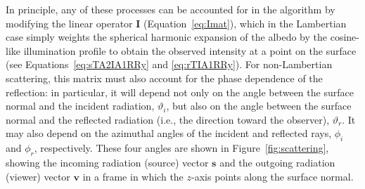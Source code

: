 \documentclass[modern]{aastex62}
\begin{document}
In principle, any of these processes can be accounted for in
the \starry algorithm by modifying the linear operator
$\mathbf{I}$ (Equation~\ref{eq:Imat}), which in the Lambertian
case simply weights the spherical harmonic expansion of the albedo
by the cosine-like illumination profile to obtain the observed
intensity at a point on the surface
(see Equations~\ref{eq:sTA2IA1RRy} and \ref{eq:rTIA1RRy}).
For non-Lambertian scattering, this matrix must also account for
the phase dependence of the reflection: in particular, it will depend
not only on the angle between the surface normal and the incident
radiation, $\vartheta_i$, but also on the angle between the surface
normal and the reflected radiation (i.e., the direction toward the
observer), $\vartheta_r$. It may also depend on the azimuthal angles
of the incident and reflected rays, $\phi_i$ and $\phi_r$, respectively.
These four angles are shown in Figure~\ref{fig:scattering}, showing
the incoming radiation (source) vector $\mathbf{s}$ and the outgoing
radiation (viewer) vector $\mathbf{v}$ in a frame in which the $z$-axis
points along the surface normal.
\end{document}
